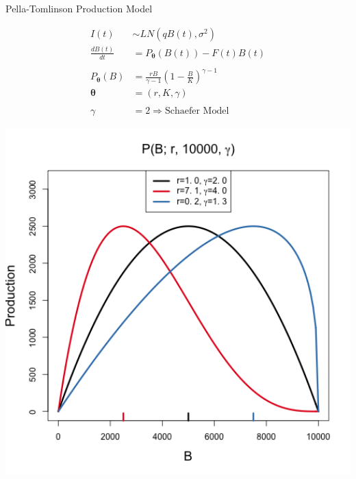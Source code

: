 \documentclass[ xcolor = pdftex, dvipsnames, table ]{beamer}
\begin{document}
%
\begin{frame}{Pella-Tomlinson Production Model}
\begin{minipage}[h!]{0.54\textwidth}
\begin{align*}
        I(t) &\sim LN(qB(t), \sigma^2)\\
        \frac{dB(t)}{dt} &= P_{\bm{\theta}}(B(t)) - F(t)B(t)\\
	~&~\\
        P_{\bm{\theta}}(B) &= \frac{rB}{\gamma-1} \left(1-\frac{B}{K}\right)^{\gamma-1}\\
        \bm{\theta} &= (r, K, \gamma)\\
        ~&~\\
        \gamma &= 2 \Rightarrow \text{Schaefer Model}
\end{align*}
\end{minipage}
\begin{minipage}[h!]{0.44\textwidth}
\includegraphics[width=1.15\textwidth]{../plots/srr1.1.png}
\end{minipage}
\end{frame}
\end{document}
